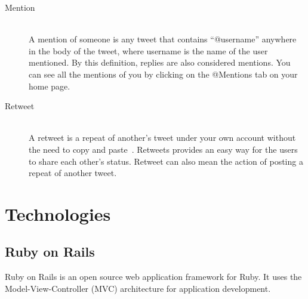 \begin{description}
\item[Mention] \hfill \\
 A mention of someone is any tweet that
  contains ``@username'' anywhere in the body of the tweet, where
  username is the name of the user mentioned. By this definition,
  replies are also considered mentions. You can see all the mentions
  of you by clicking on the @Mentions tab on your home page.

\item[Retweet] \hfill \\
A retweet is a repeat of another’s tweet under
  your own account without the need to copy and paste~\cite{morris09}.
  Retweets provides an easy way for the users to share each other's
  status. Retweet can also mean the action of posting a repeat of
  another tweet.

\end{description}

\section{Technologies}

\subsection{Ruby on Rails} %
\label{sub:ruby_on_rails}

Ruby on Rails is an open source web application framework for Ruby. It uses the Model-View-Controller (MVC) architecture for application development.




